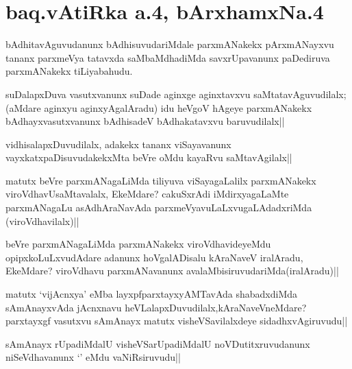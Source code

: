 \section*{baq.vAtiRka a.4, bArxhamxNa.4}


\begin{artha}
bAdhitavAguvudanunx bAdhisuvudariMdale parxmANakekx pArxmANayxvu tananx parxmeVya tatavxda 
saMbaMdhadiMda savxrUpavanunx paDediruva parxmANakekx tiLiyabahudu.
\end{artha}

\begin{artha}
suDalapxDuva vasutxvanunx suDade aginxge aginxtavxvu saMtatavAguvudilalx;(aMdare aginxyu aginxyAgalAradu) idu heVgoV hAgeye parxmANakekx bAdhayxvasutxvanunx bAdhisadeV bAdhakatavxvu baruvudilalx||
\end{artha}


\begin{artha}
vidhisalapxDuvudilalx, adakekx tananx viSayavanunx vayxkatxpaDisuvudakekxMta beVre oMdu kayaRvu saMtavAgilalx||
\end{artha}

\begin{artha}
matutx beVre parxmANagaLiMda tiliyuva viSayagaLalilx parxmANakekx viroVdhavUsaMtavalalx, EkeMdare? cakuSxrAdi iMdirxyagaLaMte parxmANagaLu asAdhAraNavAda parxmeVyavuLaLxvugaLAdadxriMda (viroVdhavilalx)||
\end{artha}

\begin{artha}
beVre parxmANagaLiMda parxmANakekx viroVdhavideyeMdu opipxkoLuLxvudAdare adanunx hoVgalADisalu kAraNaveV iralAradu, EkeMdare? viroVdhavu parxmANavanunx avalaMbisiruvudariMda(iralAradu)||
\end{artha}


\begin{artha}
matutx `vijAcnxya' eMba layxpfparxtayxyAMTavAda shabadxdiMda sAmAnayxvAda jAcnxnavu heVLalapxDuvudilalx,kAraNaveVneMdare? parxtayxgf vasutxvu sAmAnayx matutx visheVSavilalxdeye sidadhxvAgiruvudu||
\end{artha}


\begin{artha}
sAmAnayx rUpadiMdalU visheVSarUpadiMdalU noVDutitxruvudanunx niSeVdhavanunx `\stext' eMdu vaNiRsiruvudu||
\end{artha}

